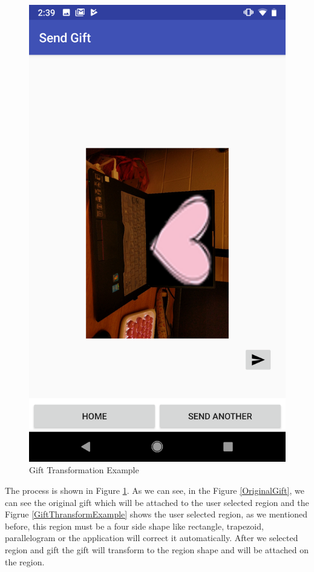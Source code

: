 \begin{figure}[H]
\begin{minipage}[H]{0.3\textwidth}
\includegraphics[width=.95\textwidth]{section04/assets/AttachedGift.png}
\subcaption{\label{AttachedGift}}
\end{minipage}%
\caption[Gift Transformation Example]{\label{GiftTransformationExample}Gift Transformation Example}
\end{figure}
\par The process is shown in Figure \ref{GiftTransformationExample}. As we can see, in the Figure \ref{OriginalGift}, we can see the original gift which will be attached to the user selected region and the Figrue \ref{GiftThransformExample} shows the user selected region, as we mentioned before, this region must be a four side shape like rectangle, trapezoid, parallelogram or the application will correct it automatically. After we selected region and gift the gift will transform to the region shape and will be attached on the region.
